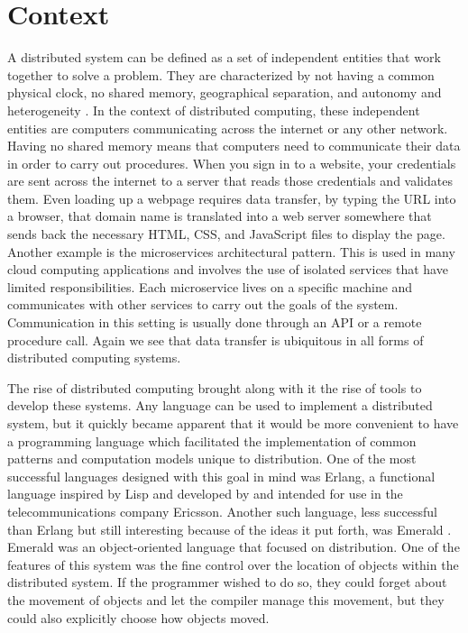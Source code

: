 
\chapter{Context}
\label{cha:context}


A distributed system can be defined as a set of independent entities that work together to solve a problem. They are characterized by not having a common physical clock, no shared memory, geographical separation, and autonomy and heterogeneity \cite{alma991001697099707681}.
In the context of distributed computing, these independent entities are computers communicating across the internet or any other network. Having no shared memory means that computers need to communicate their data in order to carry out procedures. When you sign in to a website, your credentials are sent across the internet to a server that reads those credentials and validates them. Even loading up a webpage requires data transfer, by typing the URL into a browser, that domain name is translated into a web server somewhere that sends back the necessary HTML, CSS, and JavaScript files to display the page. Another example is the microservices architectural pattern. This is used in many cloud computing applications and involves the use of isolated services that have limited responsibilities. Each microservice lives on a specific machine and communicates with other services to carry out the goals of the system. Communication in this setting is usually done through an API or a remote procedure call. Again we see that data transfer is ubiquitous in all forms of distributed computing systems.

The rise of distributed computing brought along with it the rise of tools to develop these systems. Any language can be used to implement a distributed system, but it quickly became apparent that it would be more convenient to have a programming language which facilitated the implementation of common patterns and computation models unique to distribution. One of the most successful languages designed with this goal in mind was Erlang, a functional language inspired by Lisp and developed by and intended for use in the telecommunications company Ericsson. Another such language, less successful than Erlang but still interesting because of the ideas it put forth, was Emerald \cite{BlackAndrew2007Tdot}. Emerald was an object-oriented language that focused on distribution. One of the features of this system was the fine control over the location of objects within the distributed system. If the programmer wished to do so, they could forget about the movement of objects and let the compiler manage this movement, but they could also explicitly choose how objects moved.

